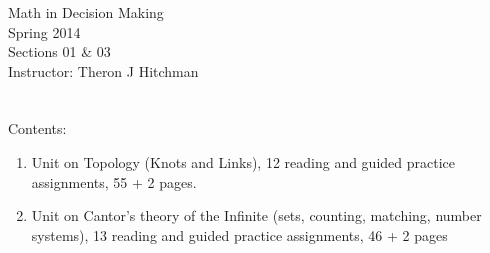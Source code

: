 \documentclass[12pt]{article}
\begin{document}
\thispagestyle{empty}

\begin{center}
{\Huge Math in Decision Making}\\[1in]
{\Large Spring 2014}\\[.5in] 
{\Large Sections 01 \& 03}\\[.5in]
{\Large Instructor: Theron J Hitchman}
\end{center}



\clearpage
\thispagestyle{empty}
$\phantom{Theron J Hitchman}$
\newpage

{\Large
Contents:
\begin{enumerate}
\item Unit on Topology (Knots and Links), 12 reading and guided practice assignments, 55 + 2 pages.

\item Unit on Cantor's theory of the Infinite (sets, counting, matching, number systems), 13 reading and guided practice assignments, 46 + 2 pages
\end{enumerate}
}
\newpage
$\phantom{Theron J Hitchman}$
\newpage


$\phantom{Theron J Hitchman}$
\newpage

\end{document}
